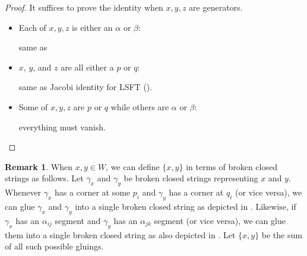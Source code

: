 \documentclass[a4paper,final, reqno]{amsart}
\theoremstyle{plain}
\theoremstyle{definition}
\newtheorem{Rem}[Th]{Remark}
\begin{document}
	\begin{proof}
		It suffices to prove the identity when $x,y,z$ are generators. 
		
		\begin{itemize}
			\item Each of $x,y,z$ is either an $\alpha$ or $\beta$:
			
			same as 
			
			\item $x$, $y$, and $z$ are all either a $p$ or $q$: 
			
			same as Jacobi identity for LSFT ().
			
			\item Some of $x,y,z$ are $p$ or $q$ while others are $\alpha$ or $\beta$: 
			
			everything must vanish.
		\end{itemize}
	\end{proof}
	
	\begin{Rem}
		When $x,y \in W$, we can define $\{x,y\}$ in terms of broken closed strings as follows. Let $\gamma_x$ and $\gamma_y$ be broken closed strings representing $x$ and $y$. Whenever $\gamma_x$ has a corner at some $p_i$ and $\gamma_y$ has a corner at $q_i$ (or vice versa), we can glue $\gamma_x$ and $\gamma_y$ into a single broken closed string as depicted in . Likewise, if $\gamma_x$ has an $\alpha_{ij}$ segment and $\gamma_y$ has an $\alpha_{jk}$ segment (or vice versa), we can glue them into a single broken closed string as also depicted in . Let $\{x,y\}$ be the sum of all such possible gluings.
	\end{Rem}
	
\end{document}
